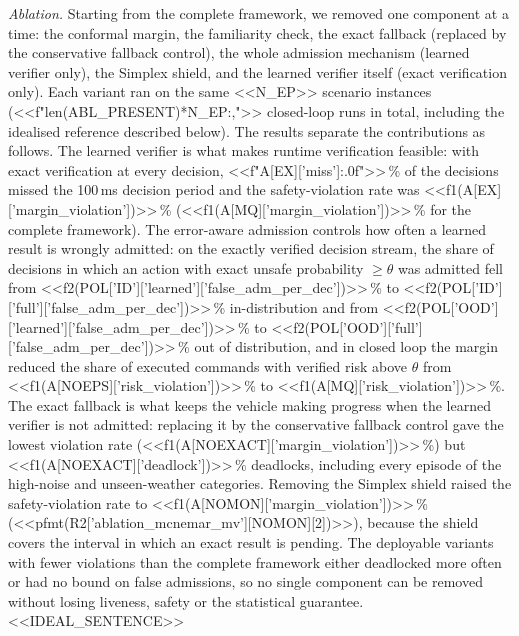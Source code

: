 \documentclass[11pt]{article}
\begin{document}
\emph{Ablation.} Starting from the complete framework, we removed one component at a time: the conformal margin, the
familiarity check, the exact fallback (replaced by the conservative fallback control), the whole admission mechanism (learned
verifier only), the Simplex shield, and the learned verifier itself (exact verification only). Each variant ran on the same
<<N_EP>> scenario instances (<<f"{len(ABL_PRESENT)*N_EP:,}">> closed-loop runs in total, including the idealised reference described below). The results separate the
contributions as follows. The learned verifier is what makes runtime verification feasible: with exact verification at every
decision, <<f"{A[EX]['miss']:.0f}">>\,\% of the decisions missed the 100\,ms decision period and the safety-violation rate was
<<f1(A[EX]['margin_violation'])>>\,\% (<<f1(A[MQ]['margin_violation'])>>\,\% for the complete framework). The error-aware admission
controls how often a learned result is wrongly admitted: on the exactly verified decision stream, the share of decisions in
which an action with exact unsafe probability $\ge\theta$ was admitted fell from <<f2(POL['ID']['learned']['false_adm_per_dec'])>>\,\% to
<<f2(POL['ID']['full']['false_adm_per_dec'])>>\,\% in-distribution and from <<f2(POL['OOD']['learned']['false_adm_per_dec'])>>\,\% to
<<f2(POL['OOD']['full']['false_adm_per_dec'])>>\,\% out of distribution, and in closed loop the margin reduced the share of executed
commands with verified risk above $\theta$ from <<f1(A[NOEPS]['risk_violation'])>>\,\% to <<f1(A[MQ]['risk_violation'])>>\,\%.
The exact fallback is what keeps the vehicle making progress when the learned verifier is not admitted: replacing it by the
conservative fallback control gave the lowest violation rate (<<f1(A[NOEXACT]['margin_violation'])>>\,\%) but
<<f1(A[NOEXACT]['deadlock'])>>\,\% deadlocks, including every episode of the high-noise and unseen-weather categories. Removing the
Simplex shield raised the safety-violation rate to <<f1(A[NOMON]['margin_violation'])>>\,\% (<<pfmt(R2['ablation_mcnemar_mv'][NOMON][2])>>),
because the shield covers the interval in which an exact result is pending. The deployable variants with fewer violations than the complete
framework either deadlocked more often or had no bound on false admissions, so no single component can be removed without losing
liveness, safety or the statistical guarantee. <<IDEAL_SENTENCE>>
\end{document}
